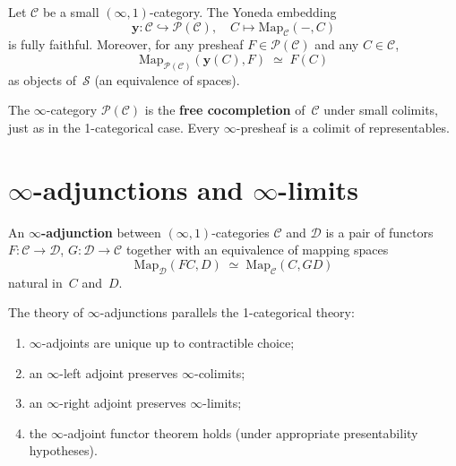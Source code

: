 \begin{theorem}\label{thm:infty-yoneda}
Let $\mathcal{C}$ be a small $(\infty,1)$-category.  The Yoneda embedding
\[
    \mathbf{y}\colon \mathcal{C}\hookrightarrow\mathcal{P}(\mathcal{C}),
    \quad C\mapsto\mathrm{Map}_\mathcal{C}(-,C)
\]
is fully faithful.  Moreover, for any presheaf
$F\in\mathcal{P}(\mathcal{C})$ and any $C\in\mathcal{C}$,
\[
    \mathrm{Map}_{\mathcal{P}(\mathcal{C})}(\mathbf{y}(C), F)
    \;\simeq\; F(C)
\]
as objects of~$\mathcal{S}$ (an equivalence of spaces).
\end{theorem}

\begin{remark}\label{rem:infty-yoneda-universal}
The $\infty$-category $\mathcal{P}(\mathcal{C})$ is the
\textbf{free cocompletion} of~$\mathcal{C}$ under small colimits,
just as in the 1-categorical case.  Every $\infty$-presheaf is a
colimit of representables.
\end{remark}



\section{$\infty$-adjunctions and $\infty$-limits}\label{sec:infty-adj}


\begin{definition}\label{def:infty-adjunction}
An \textbf{$\infty$-adjunction} between $(\infty,1)$-categories
$\mathcal{C}$ and $\mathcal{D}$ is a pair of functors
$F\colon\mathcal{C}\to\mathcal{D}$, $G\colon\mathcal{D}\to\mathcal{C}$
together with an equivalence of mapping spaces
\[
    \mathrm{Map}_\mathcal{D}(FC, D)
    \;\simeq\;
    \mathrm{Map}_\mathcal{C}(C, GD)
\]
natural in~$C$ and~$D$.
\end{definition}

\begin{remark}\label{rem:infty-adjunction-properties}
The theory of $\infty$-adjunctions parallels the 1-categorical theory:
\begin{enumerate}[label=(\roman*)]
\item $\infty$-adjoints are unique up to contractible choice;
\item an $\infty$-left adjoint preserves $\infty$-colimits;
\item an $\infty$-right adjoint preserves $\infty$-limits;
\item the $\infty$-adjoint functor theorem holds (under appropriate
      presentability hypotheses).
\end{enumerate}
\end{remark}

